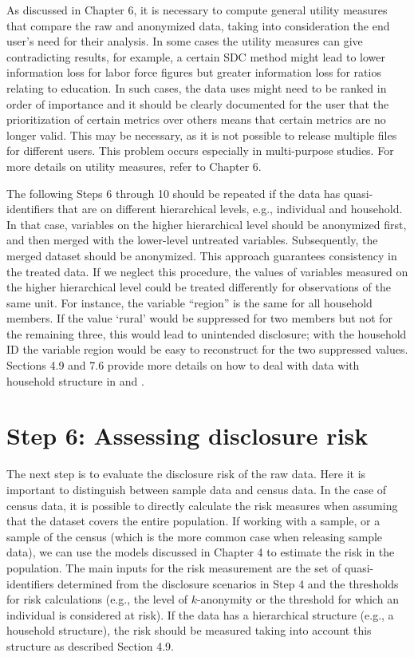 \documentclass[letterpaper,10pt,english]{sphinxmanual}
\begin{document}
As discussed in Chapter 6, it is necessary to compute general utility
measures that compare the raw and anonymized data, taking into
consideration the end user’s need for their analysis. In some cases the
utility measures can give contradicting results, for example, a certain
SDC method might lead to lower information loss for labor force figures
but greater information loss for ratios relating to education. In such
cases, the data uses might need to be ranked in order of importance and
it should be clearly documented for the user that the prioritization of
certain metrics over others means that certain metrics are no longer
valid. This may be necessary, as it is not possible to release multiple
files for different users. This problem occurs especially in
multi-purpose studies. For more details on utility measures, refer to
Chapter 6.


The following Steps 6 through 10 should be repeated if the data has
quasi-identifiers that are on different hierarchical levels, e.g.,
individual and household. In that case, variables on the higher
hierarchical level should be anonymized first, and then merged with the
lower-level untreated variables. Subsequently, the merged dataset should
be anonymized. This approach guarantees consistency in the treated data.
If we neglect this procedure, the values of variables measured on the
higher hierarchical level could be treated differently for observations
of the same unit. For instance, the variable “region” is the same for
all household members. If the value ‘rural’ would be suppressed for two
members but not for the remaining three, this would lead to unintended
disclosure; with the household ID the variable region would be easy to
reconstruct for the two suppressed values. Sections 4.9 and 7.6 provide
more details on how to deal with data with household structure in 
and .


\section{Step 6: Assessing disclosure risk}
\label{\detokenize{process:step-6-assessing-disclosure-risk}}
The next step is to evaluate the disclosure risk of the raw data. Here
it is important to distinguish between sample data and census data. In
the case of census data, it is possible to directly calculate the risk
measures when assuming that the dataset covers the entire population. If
working with a sample, or a sample of the census (which is the more
common case when releasing sample data), we can use the models discussed
in Chapter 4 to estimate the risk in the population. The main inputs for
the risk measurement are the set of quasi-identifiers determined from
the disclosure scenarios in Step 4 and the thresholds for risk
calculations (e.g., the level of \(k\)-anonymity or the threshold
for which an individual is considered at risk). If the data has a
hierarchical structure (e.g., a household structure), the risk should be
measured taking into account this structure as described Section 4.9.
\end{document}
